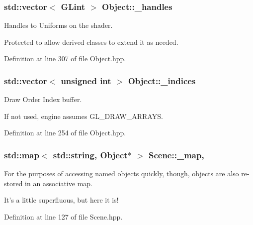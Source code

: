 \hypertarget{class_object_a983963f564898beca4bda99676245663}{
\subsubsection[{\-\_\-handles}]{\setlength{\rightskip}{0pt plus 5cm}std\-::vector$<$ G\-Lint $>$ Object\-::\-\_\-handles\hspace{0.3cm}{\ttfamily [protected]}}}\label{class_object_a983963f564898beca4bda99676245663}


Handles to Uniforms on the shader. 

Protected to allow derived classes to extend it as needed. 

Definition at line 307 of file Object.\-hpp.

\hypertarget{class_object_ab85adc7a2d3b891051c096593982653d}{
\subsubsection[{\-\_\-indices}]{\setlength{\rightskip}{0pt plus 5cm}std\-::vector$<$ unsigned int $>$ Object\-::\-\_\-indices}}\label{class_object_ab85adc7a2d3b891051c096593982653d}


Draw Order Index buffer. 

If not used, engine assumes G\-L\-\_\-\-D\-R\-A\-W\-\_\-\-A\-R\-R\-A\-Y\-S. 

Definition at line 254 of file Object.\-hpp.

\hypertarget{class_scene_a8bd5d86484a12255b26b92b6cbf8d29a}{
\subsubsection[{\-\_\-map}]{\setlength{\rightskip}{0pt plus 5cm}std\-::map$<$ std\-::string, {\bf Object}$\ast$ $>$ Scene\-::\-\_\-map\hspace{0.3cm}{\ttfamily [protected]}, {\ttfamily [inherited]}}}\label{class_scene_a8bd5d86484a12255b26b92b6cbf8d29a}


For the purposes of accessing named objects quickly, though, objects are also re-\/stored in an associative map. 

It's a little superfluous, but here it is! 

Definition at line 127 of file Scene.\-hpp.

